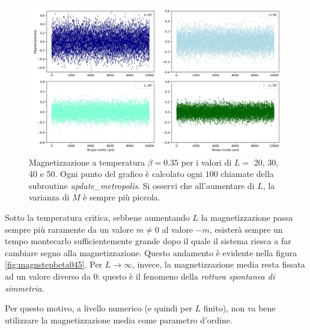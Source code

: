 \documentclass[10pt,a4paper]{article}
\begin{document}
\begin{figure}[h!]
	\centering
	\includegraphics[width=1\linewidth]{magn_step_beta035}
	\caption{Magnetizzazione a temperatura $\beta=0.35$ per i valori di $L=$ 20, 30, 40 e 50. Ogni punto del grafico è calcolato ogni $100$ chiamate della subroutine \emph{update\_metropolis}. Si osservi che all'aumentare di $L$, la varianza di $M$ è sempre più piccola.}
	\label{fig:magnstepbeta035}
\end{figure}

Sotto la temperatura critica, sebbene aumentando $L$ la magnetizzazione passa sempre più raramente da un valore $m\ne0$ al valore $-m$, esisterà sempre un tempo montecarlo sufficientemente grande dopo il quale il sistema riesca a far cambiare segno alla magnetizzazione. Questo andamento è evidente nella figura \ref{fig:magnstepbeta045}. Per $L\rightarrow\infty$, invece, la magnetizzazione media resta fissata ad un valore diverso da $0$: questo è il fenomeno della \emph{rottura spontanea di simmetria}.

Per questo motivo, a livello numerico (e quindi per $L$ finito), non va bene utilizzare la magnetizzazione media come parametro d'ordine. 
\end{document}
